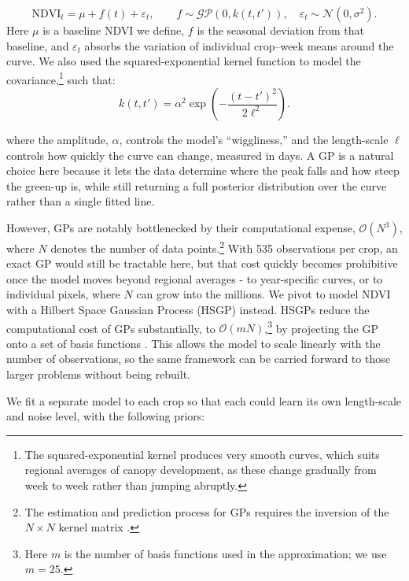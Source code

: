 \documentclass[10pt,letterpaper]{article}
\begin{document}
\begin{equation}
\mathrm{NDVI}_t=\mu+f(t)+\varepsilon_t,\qquad f\sim\mathcal{GP}\!\left(0,k(t,t')\right),\quad \varepsilon_t\sim\mathcal{N}(0,\sigma^2).
\label{eq:gp}
\end{equation}
Here $\mu$ is a baseline NDVI we define, $f$ is the seasonal deviation from that baseline, and $\varepsilon_t$ absorbs the variation of individual crop--week means around the curve. We also used the squared-exponential kernel function to model the covariance,\footnote{The squared-exponential kernel produces very smooth curves, which suits regional averages of canopy development, as these change gradually from week to week rather than jumping abruptly.} such that:
\begin{equation}
k(t,t')=\alpha^2\exp\!\left(-\frac{(t-t')^2}{2\ell^2}\right).
\label{eq:kernel}
\end{equation}

where the amplitude, $\alpha$, controls the model's ``wiggliness,'' and the length-scale $\ell$ controls how quickly the curve can change, measured in days. A GP is a natural choice here because it lets the data determine where the peak falls and how steep the green-up is, while still returning a full posterior distribution over the curve rather than a single fitted line.

However, GPs are notably bottlenecked by their computational expense, $\mathcal{O}(N^3)$, where $N$ denotes the number of data points.\footnote{The estimation and prediction process for GPs requires the inversion of the $N\times N$ kernel matrix \citep{riutort2023hsgp}.} With 535 observations per crop, an exact GP would still be tractable here, but that cost quickly becomes prohibitive once the model moves beyond regional averages - to year-specific curves, or to individual pixels, where $N$ can grow into the millions. We pivot to model NDVI with a Hilbert Space Gaussian Process (HSGP) instead. HSGPs reduce the computational cost of GPs substantially, to $\mathcal{O}(mN)$,\footnote{Here $m$ is the number of basis functions used in the approximation; we use $m=25$.} by projecting the GP onto a set of basis functions \citep{riutort2023hsgp}. This allows the model to scale linearly with the number of observations, so the same framework can be carried forward to those larger problems without being rebuilt.

We fit a separate model to each crop so that each could learn its own length-scale and noise level, with the following priors:
\end{document}
